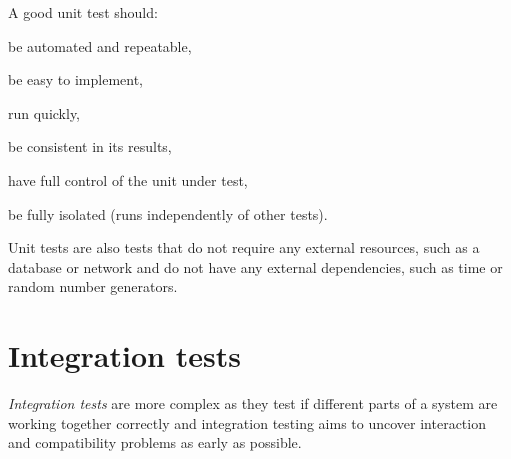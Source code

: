 \documentclass[
  print,
  table,
  nolof,
  nolot,
  nocover,
  oneside
]{fithesis3}
\begin{document}
A good unit test should:
\begin{compactitem}
  \item be automated and repeatable,
  \item be easy to implement,
  \item run quickly,
  \item be consistent in its results,
  \item have full control of the unit under test,
  \item be fully isolated (runs independently of other tests).
\end{compactitem}

Unit tests are also tests that do not require any external resources, such as a database or network and do not have any external dependencies, such as time or random number generators.


\section{Integration tests}
\label{integration tests general}

\textit{Integration tests} are more complex as they test if different parts of a system are working together correctly and integration testing aims to uncover interaction and compatibility problems as early as possible\parencite{software_testing}.
\end{document}
